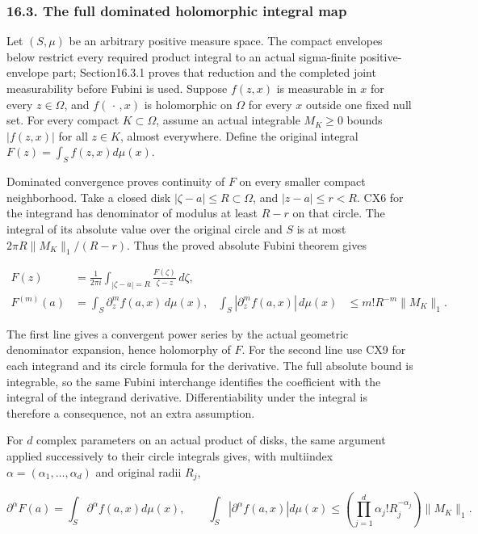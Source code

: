 \documentclass[
  11pt,
]{article}
\begin{document}
\subsubsection{16.3. The full dominated holomorphic integral
map}\label{the-full-dominated-holomorphic-integral-map}

Let \((S,\mu)\) be an arbitrary positive measure space. The compact
envelopes below restrict every required product integral to an actual
sigma-finite positive-envelope part; Section16.3.1 proves that reduction
and the completed joint measurability before Fubini is used. Suppose
\(f(z,x)\) is measurable in \(x\) for every \(z\in\Omega\), and
\(f(\,\cdot\,,x)\) is holomorphic on \(\Omega\) for every \(x\) outside
one fixed null set. For every compact \(K\subset\Omega\), assume an
actual integrable \(M_K\geq0\) bounds \(|f(z,x)|\) for all \(z\in K\),
almost everywhere. Define the original integral
\(F(z)=\int_S f(z,x)d\mu(x)\).

Dominated convergence proves continuity of \(F\) on every smaller
compact neighborhood. Take a closed disk
\(|\zeta-a|\leq R\subset\Omega\), and \(|z-a|\leq r<R\). CX6 for the
integrand has denominator of modulus at least \(R-r\) on that circle.
The integral of its absolute value over the original circle and \(S\) is
at most \(2\pi R\|M_K\|_1/(R-r)\). Thus the proved absolute Fubini
theorem gives

\[
\begin{aligned}
F(z)&=\frac1{2\pi i}\int_{|\zeta-a|=R}
                    \frac{F(\zeta)}{\zeta-z}\,d\zeta,\\
F^{(m)}(a)&=\int_S\partial_z^m f(a,x)\,d\mu(x),&
\int_S|\partial_z^m f(a,x)|\,d\mu(x)
 &\leq m!R^{-m}\|M_K\|_1 .
\end{aligned}
\tag{CX10}
\]

The first line gives a convergent power series by the actual geometric
denominator expansion, hence holomorphy of \(F\). For the second line
use CX9 for each integrand and its circle formula for the derivative.
The full absolute bound is integrable, so the same Fubini interchange
identifies the coefficient with the integral of the integrand
derivative. Differentiability under the integral is therefore a
consequence, not an extra assumption.

For \(d\) complex parameters on an actual product of disks, the same
argument applied successively to their circle integrals gives, with
multiindex \(\alpha=(\alpha_1,\ldots,\alpha_d)\) and original radii
\(R_j\),

\[
\partial^\alpha F(a)=\int_S\partial^\alpha f(a,x)d\mu(x),
\qquad
\int_S|\partial^\alpha f(a,x)|d\mu(x)
 \leq\left(\prod_{j=1}^d\alpha_j!R_j^{-\alpha_j}\right)\|M_K\|_1 .
\tag{CX11}
\]
\end{document}

